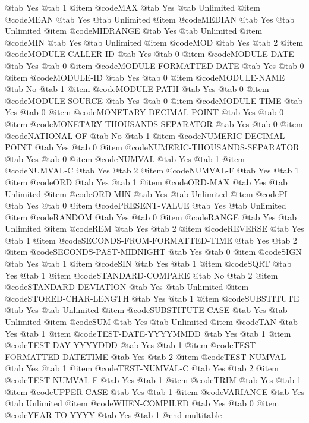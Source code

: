 @tab Yes @tab 1
@item @code{MAX}
@tab Yes @tab Unlimited
@item @code{MEAN}
@tab Yes @tab Unlimited
@item @code{MEDIAN}
@tab Yes @tab Unlimited
@item @code{MIDRANGE}
@tab Yes @tab Unlimited
@item @code{MIN}
@tab Yes @tab Unlimited
@item @code{MOD}
@tab Yes @tab 2
@item @code{MODULE-CALLER-ID}
@tab Yes @tab 0
@item @code{MODULE-DATE}
@tab Yes @tab 0
@item @code{MODULE-FORMATTED-DATE}
@tab Yes @tab 0
@item @code{MODULE-ID}
@tab Yes @tab 0
@item @code{MODULE-NAME}
@tab No @tab 1
@item @code{MODULE-PATH}
@tab Yes @tab 0
@item @code{MODULE-SOURCE}
@tab Yes @tab 0
@item @code{MODULE-TIME}
@tab Yes @tab 0
@item @code{MONETARY-DECIMAL-POINT}
@tab Yes @tab 0
@item @code{MONETARY-THOUSANDS-SEPARATOR}
@tab Yes @tab 0
@item @code{NATIONAL-OF}
@tab No @tab 1
@item @code{NUMERIC-DECIMAL-POINT}
@tab Yes @tab 0
@item @code{NUMERIC-THOUSANDS-SEPARATOR}
@tab Yes @tab 0
@item @code{NUMVAL}
@tab Yes @tab 1
@item @code{NUMVAL-C}
@tab Yes @tab 2
@item @code{NUMVAL-F}
@tab Yes @tab 1
@item @code{ORD}
@tab Yes @tab 1
@item @code{ORD-MAX}
@tab Yes @tab Unlimited
@item @code{ORD-MIN}
@tab Yes @tab Unlimited
@item @code{PI}
@tab Yes @tab 0
@item @code{PRESENT-VALUE}
@tab Yes @tab Unlimited
@item @code{RANDOM}
@tab Yes @tab 0
@item @code{RANGE}
@tab Yes @tab Unlimited
@item @code{REM}
@tab Yes @tab 2
@item @code{REVERSE}
@tab Yes @tab 1
@item @code{SECONDS-FROM-FORMATTED-TIME}
@tab Yes @tab 2
@item @code{SECONDS-PAST-MIDNIGHT}
@tab Yes @tab 0
@item @code{SIGN}
@tab Yes @tab 1
@item @code{SIN}
@tab Yes @tab 1
@item @code{SQRT}
@tab Yes @tab 1
@item @code{STANDARD-COMPARE}
@tab No @tab 2
@item @code{STANDARD-DEVIATION}
@tab Yes @tab Unlimited
@item @code{STORED-CHAR-LENGTH}
@tab Yes @tab 1
@item @code{SUBSTITUTE}
@tab Yes @tab Unlimited
@item @code{SUBSTITUTE-CASE}
@tab Yes @tab Unlimited
@item @code{SUM}
@tab Yes @tab Unlimited
@item @code{TAN}
@tab Yes @tab 1
@item @code{TEST-DATE-YYYYMMDD}
@tab Yes @tab 1
@item @code{TEST-DAY-YYYYDDD}
@tab Yes @tab 1
@item @code{TEST-FORMATTED-DATETIME}
@tab Yes @tab 2
@item @code{TEST-NUMVAL}
@tab Yes @tab 1
@item @code{TEST-NUMVAL-C}
@tab Yes @tab 2
@item @code{TEST-NUMVAL-F}
@tab Yes @tab 1
@item @code{TRIM}
@tab Yes @tab 1
@item @code{UPPER-CASE}
@tab Yes @tab 1
@item @code{VARIANCE}
@tab Yes @tab Unlimited
@item @code{WHEN-COMPILED}
@tab Yes @tab 0
@item @code{YEAR-TO-YYYY}
@tab Yes @tab 1
@end multitable
